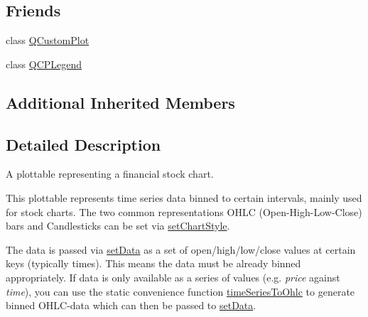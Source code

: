 \subsection*{Friends}
\begin{DoxyCompactItemize}
\item 
class \mbox{\hyperlink{class_q_c_p_financial_a1cdf9df76adcfae45261690aa0ca2198}{Q\+Custom\+Plot}}
\item 
class \mbox{\hyperlink{class_q_c_p_financial_a8429035e7adfbd7f05805a6530ad5e3b}{Q\+C\+P\+Legend}}
\end{DoxyCompactItemize}
\subsection*{Additional Inherited Members}


\subsection{Detailed Description}
A plottable representing a financial stock chart. 



This plottable represents time series data binned to certain intervals, mainly used for stock charts. The two common representations O\+H\+LC (Open-\/\+High-\/\+Low-\/\+Close) bars and Candlesticks can be set via \mbox{\hyperlink{class_q_c_p_financial_a5a59175d36279d71596e64d7bb65596f}{set\+Chart\+Style}}.

The data is passed via \mbox{\hyperlink{class_q_c_p_financial_a72089e75b8a50d18097526c3c79fdb85}{set\+Data}} as a set of open/high/low/close values at certain keys (typically times). This means the data must be already binned appropriately. If data is only available as a series of values (e.\+g. {\itshape price} against {\itshape time}), you can use the static convenience function \mbox{\hyperlink{class_q_c_p_financial_a9a058c035040d3939b8884f4aaccb1a7}{time\+Series\+To\+Ohlc}} to generate binned O\+H\+L\+C-\/data which can then be passed to \mbox{\hyperlink{class_q_c_p_financial_a72089e75b8a50d18097526c3c79fdb85}{set\+Data}}.


